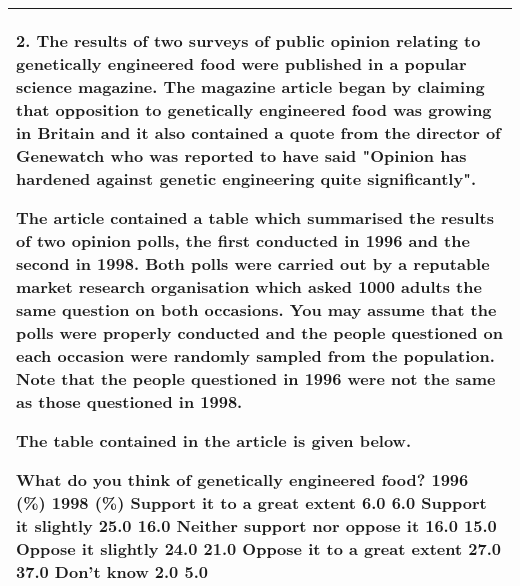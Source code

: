 \documentclass[a4paper,12pt]{article}
\begin{document}
  \begin{table}[ht!]
 \centering
 \begin{tabular}{|p{15cm}|}
 \hline  
2. The results of two surveys of public opinion relating to genetically engineered food were published in a popular science magazine.  The magazine article began by claiming that opposition to genetically engineered food was growing in Britain and it also contained a quote from the director of Genewatch who was reported to have said "Opinion has hardened against genetic engineering quite significantly". 
 
The article contained a table which summarised the results of two opinion polls, the first conducted in 1996 and the second in 1998.  Both polls were carried out by a reputable market research organisation which asked 1000 adults the same question on both occasions.  You may assume that the polls were properly conducted and the people questioned on each occasion were randomly sampled from the population.  Note that the people questioned in 1996 were not the same as those questioned in 1998. 
 
The table contained in the article is given below. 
 
What do you think of genetically engineered food?  1996 (\%) 1998 (\%) Support it to a great extent 6.0 6.0 Support it slightly 25.0 16.0 Neither support nor oppose it 16.0 15.0 Oppose it slightly 24.0 21.0 Oppose it to a great extent 27.0 37.0 Don't know 2.0 5.0 
 
 
\\ \hline
  \end{tabular}
\end{table}
\end{document}
